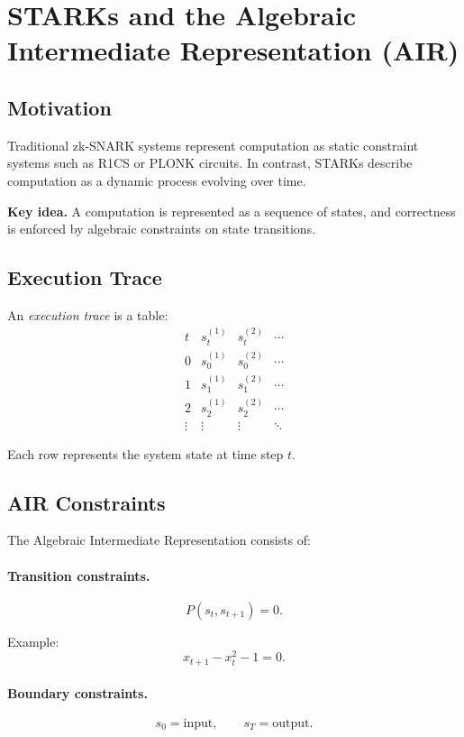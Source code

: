 \section{STARKs and the Algebraic Intermediate Representation (AIR)}

\subsection{Motivation}

Traditional zk-SNARK systems represent computation as static constraint systems such as R1CS or PLONK circuits.  
In contrast, STARKs describe computation as a dynamic process evolving over time.

\medskip

\noindent
\textbf{Key idea.}  
A computation is represented as a sequence of states, and correctness is enforced by algebraic constraints on state transitions.

\subsection{Execution Trace}

An \emph{execution trace} is a table:
\[
\begin{array}{c|ccc}
t & s_t^{(1)} & s_t^{(2)} & \cdots \\
\hline
0 & s_0^{(1)} & s_0^{(2)} & \cdots \\
1 & s_1^{(1)} & s_1^{(2)} & \cdots \\
2 & s_2^{(1)} & s_2^{(2)} & \cdots \\
\vdots & \vdots & \vdots & \ddots
\end{array}
\]

Each row represents the system state at time step $t$.

\subsection{AIR Constraints}

The Algebraic Intermediate Representation consists of:

\paragraph{Transition constraints.}
\[
P(s_t, s_{t+1}) = 0.
\]

Example:
\[
x_{t+1} - x_t^2 - 1 = 0.
\]

\paragraph{Boundary constraints.}
\[
s_0 = \text{input}, \qquad s_T = \text{output}.
\]

